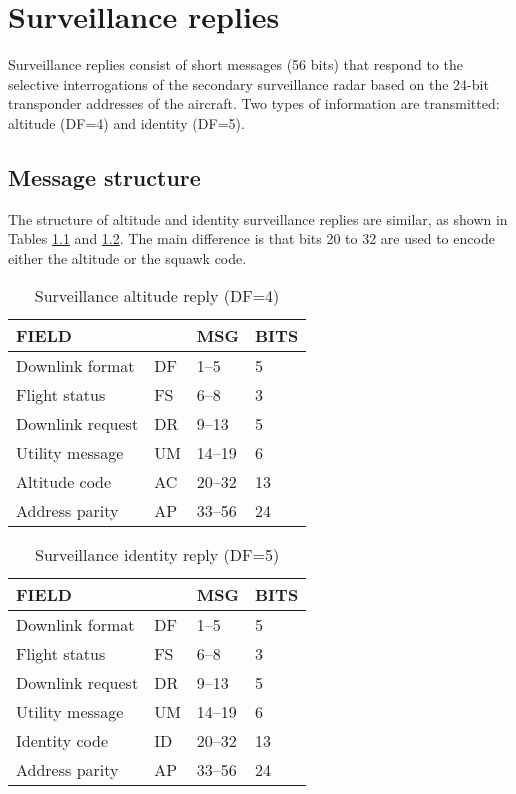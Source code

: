 \chapter{Surveillance replies} \label{chap:surv_reply}

Surveillance replies consist of short messages (56 bits) that respond to the selective interrogations of the secondary surveillance radar based on the 24-bit transponder addresses of the aircraft. Two types of information are transmitted: altitude (DF=4) and identity (DF=5).


\section{Message structure}

The structure of altitude and identity surveillance replies are similar, as shown in Tables \ref{tb:df_4_structure} and \ref{tb:df_5_structure}. The main difference is that bits 20 to 32 are used to encode either the altitude or the squawk code.

\begin{table}[ht]
  \centering
  \caption{Surveillance altitude reply (DF=4)}
  \label{tb:df_4_structure}
  \begin{tabular}[t]{|l|l|l|l|}
  \hline
  \textbf{FIELD} & \textbf{} & \textbf{MSG} & \textbf{BITS} \\ \hline
  Downlink format   & DF & 1--5    & 5   \\ \hline
  Flight status     & FS & 6--8    & 3   \\ \hline
  Downlink request  & DR & 9--13   & 5   \\ \hline
  Utility message   & UM & 14--19  & 6   \\ \hline
  Altitude code     & AC & 20--32  & 13  \\ \hline
  Address parity    & AP & 33--56  & 24  \\ \hline
  \end{tabular}
\end{table}

\begin{table}[ht]
  \centering
  \caption{Surveillance identity reply (DF=5)}
  \label{tb:df_5_structure}
  \begin{tabular}[t]{|l|l|l|l|}
  \hline
  \textbf{FIELD} & \textbf{} & \textbf{MSG} & \textbf{BITS} \\ \hline
  Downlink format   & DF & 1--5    & 5   \\ \hline
  Flight status     & FS & 6--8    & 3   \\ \hline
  Downlink request  & DR & 9--13   & 5   \\ \hline
  Utility message   & UM & 14--19  & 6   \\ \hline
  Identity code     & ID & 20--32  & 13  \\ \hline
  Address parity    & AP & 33--56  & 24  \\ \hline
  \end{tabular}
\end{table}
  

